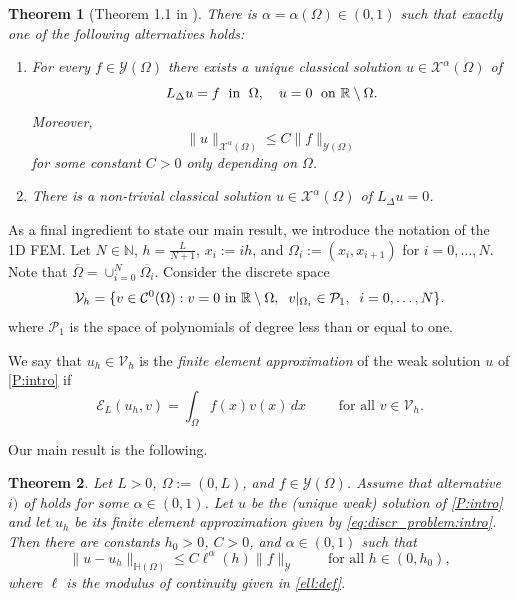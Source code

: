 \documentclass[10 pt]{article}
\newtheorem{theorem}{Theorem}[section]
\numberwithin{equation}{section}
\def\R{\mathbb{R}}
\def\cE{\mathcal{E}}
\begin{document}
\begin{theorem}[Theorem 1.1 in \cite{CS22}]\label{eq:regularity}
    There is $\alpha=\alpha(\Omega)\in(0,1)$ such that exactly one of the following alternatives holds:
    \begin{enumerate}[label=\roman*)]
        \item For every $f\in\mathcal Y(\Omega)$ there exists a unique classical solution $u\in\mathcal X^{\alpha}(\Omega)$ of
        \begin{equation}\label{eq:log_problem}
            L_{\Delta} u = f \;\textnormal{ in }\; \Omega, \quad u=0 \;\textnormal{ on } \R\setminus \Omega.
        \end{equation}
        Moreover,
        \begin{equation}\label{eq:regularity_classical}
            \|u\|_{\mathcal X^{\alpha}(\Omega)}\leq C\|f\|_{\mathcal Y(\Omega)}
        \end{equation}
        for some constant $C>0$ only depending on $\Omega$.
        \item There is a non-trivial classical solution $u\in {\mathcal X}^{\alpha}(\Omega)$ of $L_{\Delta} u=0$.
    \end{enumerate}
\end{theorem}

As a final ingredient to state our main result, we introduce the notation of the 1D FEM.  Let $N\in\mathbb N$, $h=\frac{L}{N+1}$, $x_i:=ih$, and $\Omega_i:=(x_{i},x_{i+1})$ for $i=0,\ldots,N$. Note that $\overline{\Omega}=\cup_{i=0}^N \overline{\Omega_i}$. Consider the discrete space
%
\begin{equation*}
    \mathcal V_h=\{v\in \mathcal C^0(\Omega): v=0 \textnormal{ in } \R\setminus \Omega, \;\; v|_{\Omega_i}\in \mathcal P_1, \;\;  i=0,\ldots,N\}.
\end{equation*}
%
where $\mathcal P_1$ is the space of polynomials of degree less than or equal to one.

We say that  $u_h\in \mathcal V_h$ is the \emph{finite element approximation} of the weak solution $u$ of \eqref{P:intro} if \begin{equation}\label{eq:discr_problem:intro}
    \cE_{L}(u_h,v)=\int_{\Omega} f(x) v(x)\, dx \qquad \text{ for all } v\in \mathcal V_h.
\end{equation}


 Our main result is the following.
 \begin{theorem}\label{main:thm:intro}
    Let $L>0$, $\Omega:=(0,L)$, and $f\in \mathcal{Y}(\Omega)$.  Assume that alternative $i)$ of  holds for some $\alpha\in(0,1)$. Let $u$ be the (unique weak) solution of \eqref{P:intro} and let $u_h$ be its finite element approximation given by \eqref{eq:discr_problem:intro}. Then there are constants $h_0>0$, $C>0$, and $\alpha\in(0,1)$ such that
    \begin{equation*}
        \|u-u_h\|_{\mathbb H(\Omega)}\leq C\ell^{\alpha}(h)\|f\|_{\mathcal Y}\qquad \text{ for all }h\in(0,h_0),
    \end{equation*}
    where $\ell$ is the modulus of continuity given in \eqref{ell:def}.
 \end{theorem}
\end{document}
